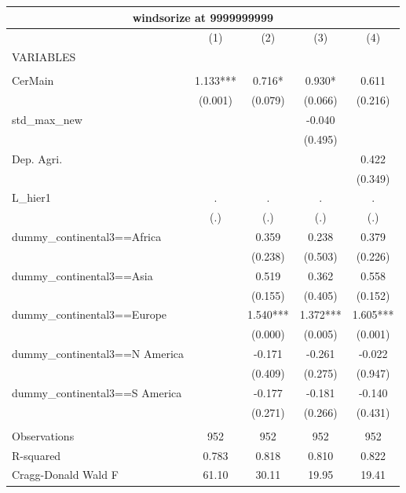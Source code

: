\begin{tabular}{lcccc}
\multicolumn{5}{c}{windsorize at 9999999999} \\ \hline
 & (1) & (2) & (3) & (4) \\
VARIABLES &  &  &  &  \\ \hline
 &  &  &  &  \\
CerMain & 1.133*** & 0.716* & 0.930* & 0.611 \\
 & (0.001) & (0.079) & (0.066) & (0.216) \\
std\_max\_new &  &  & -0.040 &  \\
 &  &  & (0.495) &  \\
Dep. Agri. &  &  &  & 0.422 \\
 &  &  &  & (0.349) \\
L\_hier1 & . & . & . & . \\
 & (.) & (.) & (.) & (.) \\
dummy\_continental3==Africa &  & 0.359 & 0.238 & 0.379 \\
 &  & (0.238) & (0.503) & (0.226) \\
dummy\_continental3==Asia &  & 0.519 & 0.362 & 0.558 \\
 &  & (0.155) & (0.405) & (0.152) \\
dummy\_continental3==Europe &  & 1.540*** & 1.372*** & 1.605*** \\
 &  & (0.000) & (0.005) & (0.001) \\
dummy\_continental3==N America &  & -0.171 & -0.261 & -0.022 \\
 &  & (0.409) & (0.275) & (0.947) \\
dummy\_continental3==S America &  & -0.177 & -0.181 & -0.140 \\
 &  & (0.271) & (0.266) & (0.431) \\
 &  &  &  &  \\
Observations & 952 & 952 & 952 & 952 \\
R-squared & 0.783 & 0.818 & 0.810 & 0.822 \\
 Cragg-Donald Wald F & 61.10 & 30.11 & 19.95 & 19.41 \\ \hline
\end{tabular}
